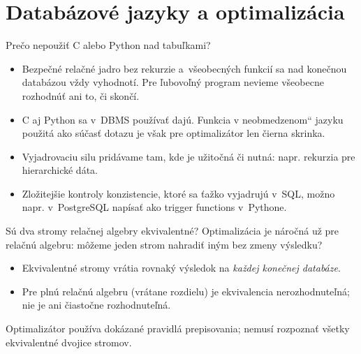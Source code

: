 \documentclass[12pt]{beamer}
\providecommand{\uv}[1]{\quotedblbase #1\textquotedblleft}
\begin{document}
\section{Databázové jazyky a optimalizácia}
\begin{frame}{Prečo nepoužiť C alebo Python nad tabuľkami?}
  \begin{itemize}
    \item Bezpečné relačné jadro bez rekurzie a~všeobecných funkcií
      sa nad konečnou databázou vždy vyhodnotí.
      Pre ľubovoľný program nevieme všeobecne rozhodnúť ani to, či skončí.
    \item C aj Python sa v~DBMS používať dajú.
      Funkcia v \uv{neobmedzenom} jazyku použitá ako súčasť dotazu je však pre optimalizátor len čierna skrinka.
    \item Vyjadrovaciu silu pridávame tam, kde je užitočná či nutná:
      napr. rekurzia pre hierarchické dáta.
    \item Zložitejšie kontroly konzistencie, ktoré sa ťažko vyjadrujú
      v~SQL, možno napr. v~PostgreSQL napísať ako trigger functions
      v~Pythone.
  \end{itemize}
\end{frame}

\begin{frame}{Sú dva stromy relačnej algebry ekvivalentné?}
  Optimalizácia je náročná už pre relačnú algebru:
  môžeme jeden strom nahradiť iným bez zmeny výsledku?
  \begin{itemize}
    \item Ekvivalentné stromy vrátia rovnaký výsledok na
      \emph{každej konečnej databáze}.
    \item Pre plnú relačnú algebru (vrátane rozdielu) je ekvivalencia
      \alert{nerozhodnuteľná}; nie je ani čiastočne rozhodnuteľná.
  \end{itemize}
  Optimalizátor používa dokázané pravidlá prepisovania;
  nemusí rozpoznať všetky ekvivalentné dvojice stromov.
\end{frame}
\end{document}

